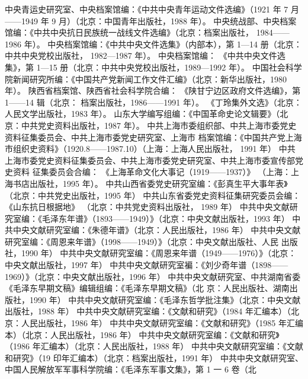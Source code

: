 \begin{thebibliography}{999}
\bibitem{} 中央青运史研究室、中央档案馆编：《中共中央青年运动文件选编》（1921 年 7 月——1949 年 9 月）（北京：中国青年出版社，1988 年）。
\bibitem{} 中央统战部、中央档案馆编：《中共中央抗日民族统一战线文件选编》（北京：档案出版社，
1984——1986 年）。
\bibitem{} 中央档案馆编：《中共中央文件选集》（内部本），第 1—14 册（北京：中共中央党校出版社，
1982—1987 年）。
\bibitem{} 中央档案馆编：
\bibitem{} 《中共中央文件选集》，第 1—15 册（北京：中共中央党校出版社，1989—1992
年）。
\bibitem{} 中国社会科学院新闻研究所编：《中国共产党新闻工作文件汇编》（北京：新华出版社，1980
年）。
\bibitem{} 陕西省档案馆、陕西省社会科学院合编：
\bibitem{} 《陕甘宁边区政府文件选编》，第 1——14 辑（北京：
档案出版社，1986——1991 年）。
\bibitem{} 《丁玲集外文选》（北京：人民文学出版社，1983 年）。
山东大学编写组编：《中国革命史论文辑要》（北京：中共党史资料出版社，1987 年）。
\bibitem{} 中共上海市委组织部、中共上海市委党史资料征集委员会、中共上海市委党史研究室、上海市
档案馆编：《中国共产党上海市组织史资料》（1920.8——1987.10）（上海：上海人民出版社，
1991 年）
\bibitem{} 中共上海市委党史资料征集委员会、中共上海市委党史研究室、中共上海市委宣传部党史资料
征集委员会合编：
《上海革命文化大事记（1919——1937）》
（上海：上海书店出版社，1995 年）。
\bibitem{} 中共山西省委党史研究室编：《彭真生平大事年表》（北京：中共党史出版社，1995 年）
\bibitem{} 中共山东省委党史资料征集研究委员会编：
《山东抗日根据地》
\bibitem{} （北京：中共党史资料出版社，
1989 年）
\bibitem{} 中共中央文献研究室编：《毛泽东年谱》（1893——1949）》（北京：中央文献出版社，1993
年）
\bibitem{} 中共中央文献研究室编：《朱德年谱》（北京：人民出版社，1986 年）
\bibitem{} 中共中央文献研究室编：《周恩来年谱》（1998——1949）》（北京：中央文献出版社、人民
出版社，1990 年）
\bibitem{} 中共中央文献研究室编：《周恩来年谱（1949——1976）》（北京：中央文献出版社，1997
年）
\bibitem{} 中共中央文献研究室褊：《刘少奇年谱（1898——1969）》（北京：中央文献出版社，1996
年）
\bibitem{} 中共中央文献研究室、中共湖南省委《毛泽东早期文稿》编辑组编：《毛泽东早期文稿》（北
京：人民出版社、湖南出版社，1990 年）
\bibitem{} 中共中央文献研究室编：《毛泽东哲学批注集》（北京：中央文献出版社，1988 年）
\bibitem{} 中共中央文献研究室编：《文献和研究》（1984 年汇编本）（北京：人民出版社，1986 年）
\bibitem{} 中共中央文献研究室编：《文献和研究》（1985 年汇编本）（北京：人民出版社，1986 年）
\bibitem{} 中共中央文献研究室编：《文献和研究》（1986 年汇编本）（北京：人民出版社，1988 年）
\bibitem{} 中共中央文献研究室编：《文献和研究》（19 印年汇编本）（北京：档案出版社，1991 年）
\bibitem{} 中共中央文献研究室、中国人民解放军军事科学院编：《毛泽东军事文集》，第 1 一 6 卷（北

\end{thebibliography}
